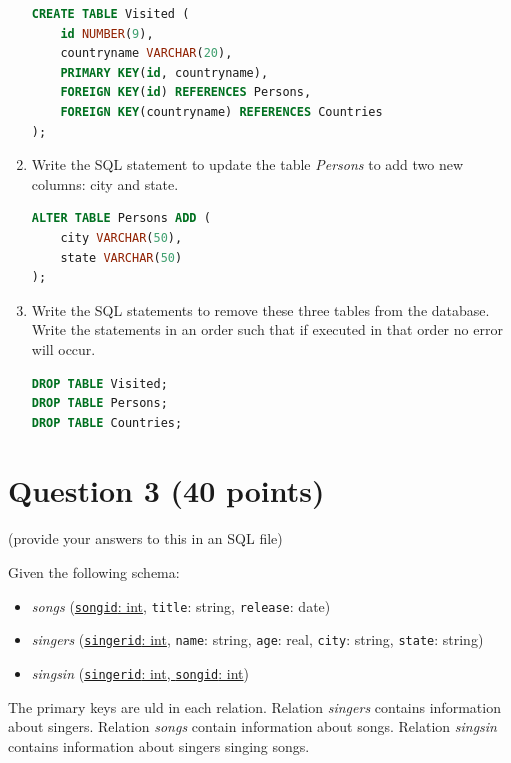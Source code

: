 \documentclass[letterpaper, 11pt]{article}
\begin{document}
\begin{enumerate}[label={\alph*})]
\begin{tcolorbox}
\begin{lstlisting}[language=SQL]
CREATE TABLE Visited (
    id NUMBER(9),
    countryname VARCHAR(20),
    PRIMARY KEY(id, countryname),
    FOREIGN KEY(id) REFERENCES Persons,
    FOREIGN KEY(countryname) REFERENCES Countries
);
    \end{lstlisting}
    \end{tcolorbox}
    
    \item Write the SQL statement to update the table \textit{Persons} to add two new columns: city and state.
    \begin{tcolorbox}
    \begin{lstlisting}[language=SQL]
ALTER TABLE Persons ADD (
    city VARCHAR(50),
    state VARCHAR(50)
);
    \end{lstlisting}   
    \end{tcolorbox}
    
    
    \item Write the SQL statements to remove these three tables from the database. Write the statements in an order such that if executed in that order no error will occur.
    \begin{tcolorbox}
    \begin{lstlisting}[language=SQL]
DROP TABLE Visited;
DROP TABLE Persons;
DROP TABLE Countries;
    \end{lstlisting}
    \end{tcolorbox}
    
\end{enumerate}

\section*{Question 3 (40 points)}

(provide your answers to this in an SQL file)

Given the following schema:
\begin{itemize}
    \item \textit{songs} (\ul{\texttt{songid}: int}, \texttt{title}: string, \texttt{release}: date)
    \item \textit{singers} (\ul{\texttt{singerid}: int}, \texttt{name}: string, \texttt{age}: real, \texttt{city}: string, \texttt{state}: string)
    \item \textit{singsin} (\ul{\texttt{singerid}: int, \texttt{songid}: int})
\end{itemize}

The primary keys are uld in each relation. Relation \textit{singers} contains information about singers. Relation \textit{songs} contain information about songs. Relation \textit{singsin} contains information about singers singing songs.
\end{document}
